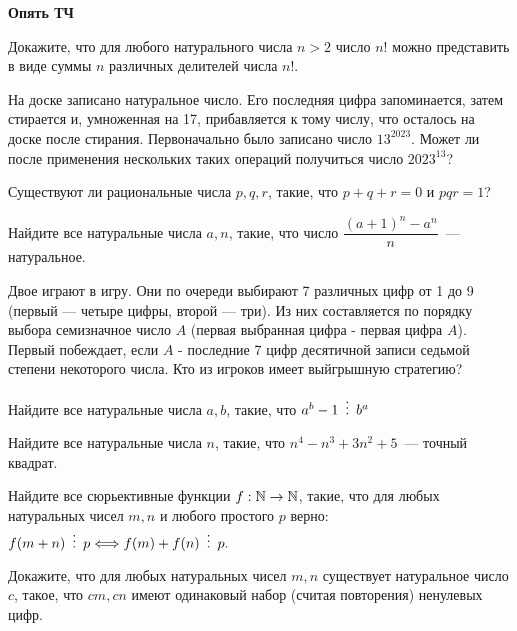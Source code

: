 \documentclass{article}
\begin{document}
    \large

    \begin{center}
        \textbf{Опять ТЧ}
    \end{center}

    \begin{enumerate_boxed}

        \item Докажите, что для любого натурального числа $n > 2$ число $n!$ можно представить в виде суммы $n$ различных делителей числа $n!$.

        \item На доске записано натуральное число.
        Его последняя цифра запоминается, затем стирается и, умноженная на 17, прибавляется к тому числу, что осталось на доске после стирания.
        Первоначально было записано число $13^{2023}$.
        Может ли после применения нескольких таких операций получиться число $2023^{13}$?

        \item Существуют ли рациональные числа $p, q, r$, такие, что $p + q + r = 0$ и $pqr = 1$?

        \item Найдите все натуральные числа $a, n$, такие, что число
        $\dfrac{(a + 1)^n - a^n}{n}$~--- натуральное.

        \item Двое играют в игру.
        Они по очереди выбирают 7 различных цифр от 1 до 9 (первый — четыре цифры, второй — три).
        Из них составляется по порядку выбора семизначное число $A$ (первая выбранная цифра - первая цифра $A$).
        Первый побеждает, если $A$ - последние 7 цифр десятичной записи седьмой степени некоторого числа.
        Кто из игроков имеет выйгрышную стратегию?

        \item Найдите все натуральные числа $a, b$, такие, что $a^b - 1 \,\,\,\vdots\,\,\, b^a$

        \item Найдите все натуральные числа $n$, такие, что $n^4 - n^3 + 3n^2 + 5$~--- точный квадрат.

        \item Найдите все сюрьективные функции $f : \mathbb{N} \rightarrow \mathbb{N}$, такие, что для любых натуральных чисел $m, n$ и любого простого $p$ верно:
        $f(m + n) \,\,\,\vdots\,\,\, p \Longleftrightarrow f(m) + f(n) \,\,\,\vdots\,\,\, p.$

        \item Докажите, что для любых натуральных чисел $m, n$ существует натуральное число $c$, такое, что $cm, cn$ имеют одинаковый набор (считая повторения) ненулевых цифр.

    \end{enumerate_boxed}
\end{document}
